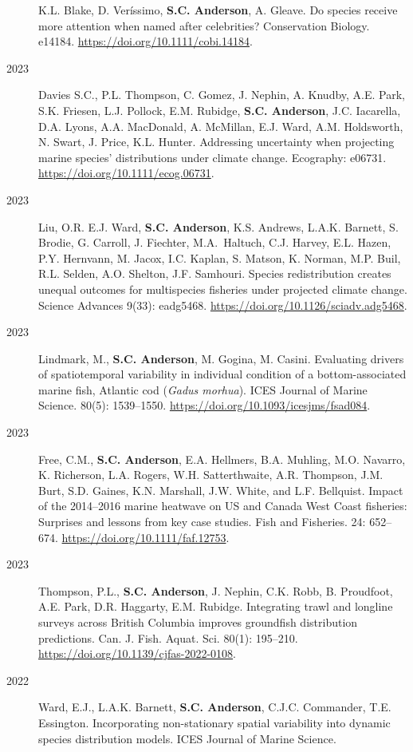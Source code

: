 \begin{description}
K.L. Blake, D. Veríssimo, \textbf{S.C. Anderson}, A. Gleave. Do species
receive more attention when named after celebrities? Conservation
Biology. e14184. \url{https://doi.org/10.1111/cobi.14184}.
\item[2023]
Davies S.C., P.L. Thompson, C. Gomez, J. Nephin, A. Knudby, A.E. Park,
S.K. Friesen, L.J. Pollock, E.M. Rubidge, \textbf{S.C. Anderson}, J.C.
Iacarella, D.A. Lyons, A.A. MacDonald, A. McMillan, E.J. Ward, A.M.
Holdsworth, N. Swart, J. Price, K.L. Hunter. Addressing uncertainty when
projecting marine species' distributions under climate change.
Ecography: e06731. \url{https://doi.org/10.1111/ecog.06731}.
\item[2023]
Liu, O.R. E.J. Ward, \textbf{S.C. Anderson}, K.S. Andrews, L.A.K.
Barnett, S. Brodie, G. Carroll, J. Fiechter, M.A.\ Haltuch, C.J. Harvey,
E.L. Hazen, P.Y. Hernvann, M. Jacox, I.C. Kaplan, S. Matson, K. Norman,
M.P. Buil, R.L. Selden, A.O. Shelton, J.F. Samhouri. Species
redistribution creates unequal outcomes for multispecies fisheries under
projected climate change. Science Advances 9(33): eadg5468.
\url{https://doi.org/10.1126/sciadv.adg5468}.
\item[2023]
Lindmark, M., \textbf{S.C. Anderson}, M. Gogina, M. Casini. Evaluating
drivers of spatiotemporal variability in individual condition of a
bottom-associated marine fish, Atlantic cod (\emph{Gadus morhua}). ICES
Journal of Marine Science. 80(5): 1539--1550.
\url{https://doi.org/10.1093/icesjms/fsad084}.
\item[2023]
Free, C.M., \textbf{S.C. Anderson}, E.A. Hellmers, B.A. Muhling, M.O.
Navarro, K. Richerson, L.A. Rogers, W.H. Satterthwaite, A.R. Thompson,
J.M. Burt, S.D. Gaines, K.N. Marshall, J.W. White, and L.F. Bellquist.
Impact of the 2014--2016 marine heatwave on US and Canada West Coast
fisheries: Surprises and lessons from key case studies. Fish and
Fisheries. 24: 652--674. \url{https://doi.org/10.1111/faf.12753}.
\item[2023]
Thompson, P.L., \textbf{S.C. Anderson}, J. Nephin, C.K. Robb, B.
Proudfoot, A.E. Park, D.R. Haggarty, E.M. Rubidge. Integrating trawl and
longline surveys across British Columbia improves groundfish
distribution predictions. Can. J. Fish. Aquat. Sci. 80(1): 195--210.
\url{https://doi.org/10.1139/cjfas-2022-0108}.
\item[2022]
Ward, E.J., L.A.K. Barnett, \textbf{S.C. Anderson}, C.J.C. Commander,
T.E. Essington. Incorporating non-stationary spatial variability into
dynamic species distribution models. ICES Journal of Marine Science.

\end{description}
